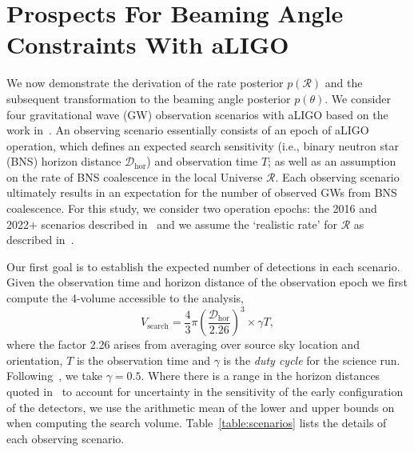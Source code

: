 \documentclass[twocolumn,nofootinbib]{revtex4-1}
\newcommand{\cbcrate}{{{\mathcal R}}}
\newcommand{\dhor}{{\mathcal D}_{\mathrm{hor}}}
\def\bns#1{binary neutron star#1 (BNS#1)\gdef\bns{BNS}}
\def\gw#1{gravitational wave#1 (GW#1)\gdef\gw{GW}}
\begin{document}
\section{Prospects For Beaming Angle Constraints With aLIGO} We now demonstrate
the derivation of the rate posterior $p(\cbcrate)$ and the subsequent
transformation to the beaming angle posterior $p(\theta)$.  We consider four
\gw{} observation scenarios with aLIGO based on the work
in~\cite{ade_prospects}.  An observing scenario essentially consists of an epoch
of aLIGO operation, which defines an expected search sensitivity (i.e., \bns{}
horizon distance $\dhor$) and observation time $T$; as well as an assumption on
the rate of \bns{} coalescence in the local Universe $\cbcrate$.  Each observing
scenario ultimately results in an expectation for the number of observed \gw{s}
from \bns{} coalescence. For this study, we consider two operation epochs: the
2016 and 2022+ scenarios described in~\cite{ade_prospects} and we assume the
`realistic rate' for $\cbcrate$ as described in~\cite{rates_paper}.

Our first goal is to establish the expected number of detections in each
scenario. Given the observation time and horizon distance of the observation
epoch we first compute the 4-volume accessible to the analysis,
%
\begin{equation}
    \label{eq:search_volume}
    V_{\mathrm{search}} = \frac{4}{3}\pi \left(\frac{\dhor}{2.26}\right)^3 \times \gamma T,
\end{equation}
%
where the factor 2.26 arises from averaging over source sky location and
orientation, $T$ is the observation time and $\gamma$ is the \emph{duty cycle}
for the science run.  Following~\cite{ade_prospects}, we take $\gamma=0.5$.
Where there is a range in the horizon distances quoted in~\cite{ade_prospects}
to account for uncertainty in the sensitivity of the early configuration of the
detectors, we use the arithmetic mean of the lower and upper bounds on when
computing the search volume. Table~\ref{table:scenarios} lists the details of
each observing scenario.
\end{document}
